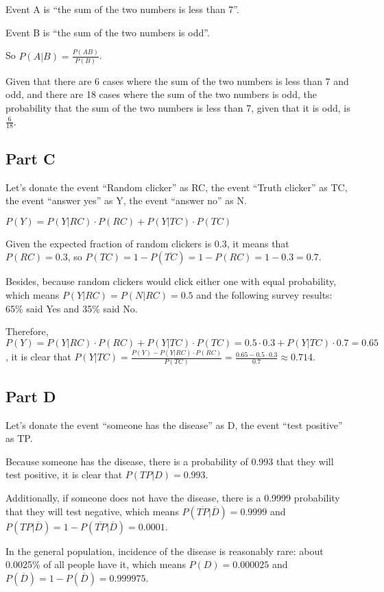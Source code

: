 \documentclass[
]{article}
\begin{document}
Event A is ``the sum of the two numbers is less than 7''.

Event B is ``the sum of the two numbers is odd''.

So \(P(A|B)=\frac{P(AB)}{P(B)}\).

Given that there are 6 cases where the sum of the two numbers is less
than 7 and odd, and there are 18 cases where the sum of the two numbers
is odd, the probability that the sum of the two numbers is less than 7,
given that it is odd, is \(\frac{6}{18}\).

\hypertarget{part-c-1}{%
\subsection{Part C}\label{part-c-1}}

Let's donate the event ``Random clicker'' as RC, the event ``Truth
clicker'' as TC, the event ``answer yes'' as Y, the event ``answer no''
as N.

\(P(Y)=P(Y|RC)\cdot P(RC)+P(Y|TC)\cdot P(TC)\)

Given the expected fraction of random clickers is 0.3, it means that
\(P(RC)=0.3\), so \(P(TC)=1-P(\overline {TC})=1-P(RC)=1-0.3=0.7\).

Besides, because random clickers would click either one with equal
probability, which means \(P(Y|RC)=P(N|RC)=0.5\) and the following
survey results: 65\% said Yes and 35\% said No.~

Therefore,
\(P(Y)=P(Y|RC)\cdot P(RC)+P(Y|TC)\cdot P(TC)=0.5\cdot0.3+P(Y|TC)\cdot0.7=0.65\),
it is clear that
\(P(Y|TC)=\frac{P(Y)-P(Y|RC)\cdot P(RC)}{P(TC)}=\frac{0.65-0.5\cdot0.3}{0.7}\approx0.714\).

\hypertarget{part-d}{%
\subsection{Part D}\label{part-d}}

Let's donate the event ``someone has the disease'' as D, the event
``test positive'' as TP.

Because someone has the disease, there is a probability of 0.993 that
they will test positive, it is clear that \(P(TP|D)=0.993\).

Additionally, if someone does not have the disease, there is a 0.9999
probability that they will test negative, which means
\(P(\overline {TP}|\overline D)=0.9999\) and
\(P(TP|\overline D)=1-P(\overline {TP}|\overline D)=0.0001\).

In the general population, incidence of the disease is reasonably rare:
about 0.0025\% of all people have it, which means \(P(D)=0.000025\) and
\(P(\overline D)=1-P(\overline D)=0.999975\).
\end{document}
